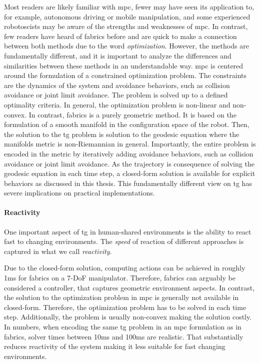 Most readers are likely familiar with \acl{mpc}, fewer may have seen its application
to, for example, autonomous driving or mobile manipulation, and some 
experienced robotoscists may be aware of the strengths and weaknesses of
\ac{mpc}. In contrast, few readers have heard of \acf{fabrics} before and are 
quick to make a connection between both methods due to the word
\textit{optimization}. However, the methods are
fundamentally different,
and it is important to analyze the differences and similarities between
these methods in an understandable way.
\ac{mpc} is centered around the
formulation of a constrained optimization problem. The constraints are
the dynamics of the system and avoidance behaviors, such as collision avoidance
or joint limit avoidance. The problem is solved up to a defined optimality 
criteria. In general, the optimization problem is non-linear and non-convex.
In contrast, \ac{fabrics} is a purely geometric method. It is based on the
formulation of a smooth manifold in the configuration space of the robot.
Then, the solution to the \ac{tg} problem is solution to the geodesic equation
where the manifolds metric is non-Riemannian in general. Importantly, the entire
problem is encoded in the metric by iteratively adding avoidance
behaviors, such as collision avoidance or joint limit avoidance. As the
trajectory is consequence of solving the geodesic equation in each time step, a
closed-form solution is available for explicit behaviors as discussed in this
thesis.
This fundamentally different view on \ac{tg} has severe implications on
practical implementations.

\paragraph{Reactivity}
\label{par:discussion_reactivity}

One important aspect of \ac{tg} in human-shared environments is the ability to
react fast to changing environments. The \textit{speed} of reaction
of different approaches is captured in what we call \textit{reactivity}.

Due to the closed-form solution, computing actions can be
achieved in roughly 1ms for \ac{fabrics} on a 7-DoF
manipulator. Therefore, \ac{fabrics} can arguably be
considered a controller, that captures geometric environment
aspects. In contrast, the solution to the optimization
problem in \ac{mpc} is generally not available in
closed-form. Therefore, the optimization problem has to be 
solved in each time step. Additionally, the problem is
usually non-convex making the solution costly. In numbers,
when encoding the same \ac{tg} problem in an \ac{mpc}
formulation as in \ac{fabrics}, solver times between 10ms
and 100ms are realistic. That substantially reduces
reactivity of the system making it less suitable for fast
changing environments.

